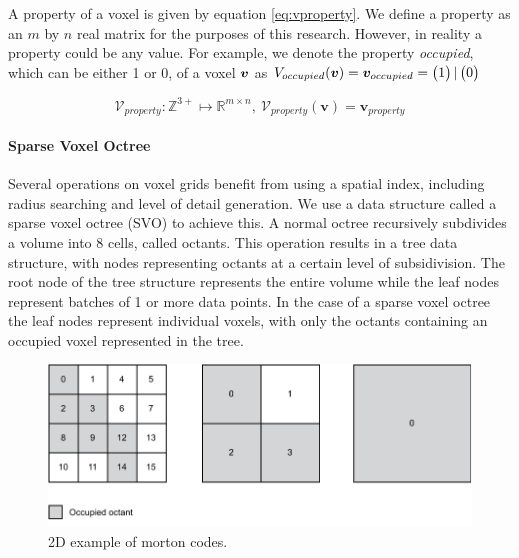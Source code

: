 A property of a voxel is given by equation \ref{eq:vproperty}. We define a property as an \(m\) by \(n\) real matrix for the purposes of this research. However, in reality a property could be any value. For example, we denote the property \textit{occupied}, which can be either 1 or 0, of a voxel \(\boldsymbol{v}\) as \(V_{occupied}(\boldsymbol{v}) = \boldsymbol{v}_{occupied} = \begin{pmatrix} 1 \end{pmatrix} | \begin{pmatrix} 0 \end{pmatrix}\)

\begin{equation}
    \label{eq:vproperty}
    \mathcal{V}_{property}: \mathbb{Z}^{3+} \mapsto \mathbb{R}^{m \times n},\ \mathcal{V}_{property}(\boldsymbol{v}) = \boldsymbol{v}_{property}
\end{equation}


\paragraph{Sparse Voxel Octree}
Several operations on voxel grids benefit from using a spatial index, including radius searching and level of detail generation. We use a data structure called a sparse voxel octree (SVO) to achieve this. A normal octree recursively subdivides a volume into 8 cells, called octants. This operation results in a tree data structure, with nodes representing octants at a certain level of subsidivision. The root node of the tree structure represents the entire volume while the leaf nodes represent batches of 1 or more data points. In the case of a sparse voxel octree the leaf nodes represent individual voxels, with only the octants containing an occupied voxel represented in the tree. 

\begin{figure}[h]
    \centering
    \includegraphics*[width=.7\textwidth]{./fig/morton_code.pdf}
    \caption{2D example of morton codes.}
    \label{fig:vg_morton}
\end{figure}

